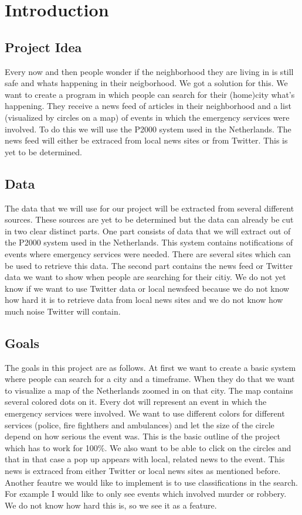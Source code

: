 \section{Introduction}
\subsection*{Project Idea}
Every now and then people wonder if the neighborhood they are living in is still safe and whats happening in their neigborhood. 
We got a solution for this. We want to create a program in which people can search for their (home)city what's happening. They receive a news feed of articles in their neighborhood and a list (visualized by circles on a map) of events in which the emergency services were involved. To do this we will use the P2000 system used in the Netherlands. The news feed will either be extraced from local news sites or from Twitter. This is yet to be determined. 

\subsection*{Data}
The data that we will use for our project will be extracted from several different sources. These sources are yet to be determined but the data can already be cut in two clear distinct parts. One part consists of data that we will extract out of the P2000 system used in the Netherlands. This system contains notifications of events where emergency services were needed. There are several sites which can be used to retrieve this data. 
The second part contains the news feed or Twitter data we want to show when people are searching for their citiy. We do not yet know if we want to use Twitter data or local newsfeed because we do not know how hard it is to retrieve data from local news sites and we do not know how much noise Twitter will contain.
\subsection*{Goals}
The goals in this project are as follows. At first we want to create a basic system where people can search for a city and a timeframe. When they do that we want to visualize a map of the Netherlands zoomed in on that city. The map contains several colored dots on it. Every dot will represent an event in which the emergency services were involved. We want to use different colors for different services (police, fire fighthers and ambulances) and let the size of the circle depend on how serious the event was. This is the basic outline of the project which has to work for 100$\%$. We also want to be able to click on the circles and that in that case a pop up appears with local, related news to the event. This news is extraced from either Twitter or local news sites as mentioned before. Another feautre we would like to implement is to use classifications in the search. For example I would like to only see events which involved murder or robbery. We do not know how hard this is, so we see it as a feature.
